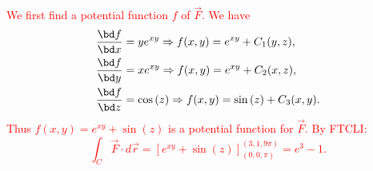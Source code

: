 \documentclass[12pt,reqno]{amsart}
\begin{document}
\begin{enumerate}
\textcolor{red}{We first find a potential function $f$ of $\vec{F}$. We have
\begin{align*}
\frac{\bd f}{\bd x} &= ye^{xy} \Rightarrow f(x,y) = e^{xy}+C_1(y,z), \\
\frac{\bd f}{\bd y} &= xe^{xy} \Rightarrow f(x,y) = e^{xy} + C_2(x,z), \\
\frac{\bd f}{\bd z} &= \cos{(z)} \Rightarrow f(x,y) = \sin{(z)} + C_3(x,y).
\end{align*}
Thus $f(x,y) = e^{xy} + \sin{(z)}$ is a potential function for $\vec{F}$. By FTCLI:
	\[\int_C \vec{F} \cdot d\vec{r} = \left[e^{xy} + \sin{(z)} \right]_{(0,0,\pi)}^{(3,1,9\pi)} = e^3-1.
	\]}
\end{enumerate}
\end{document}
